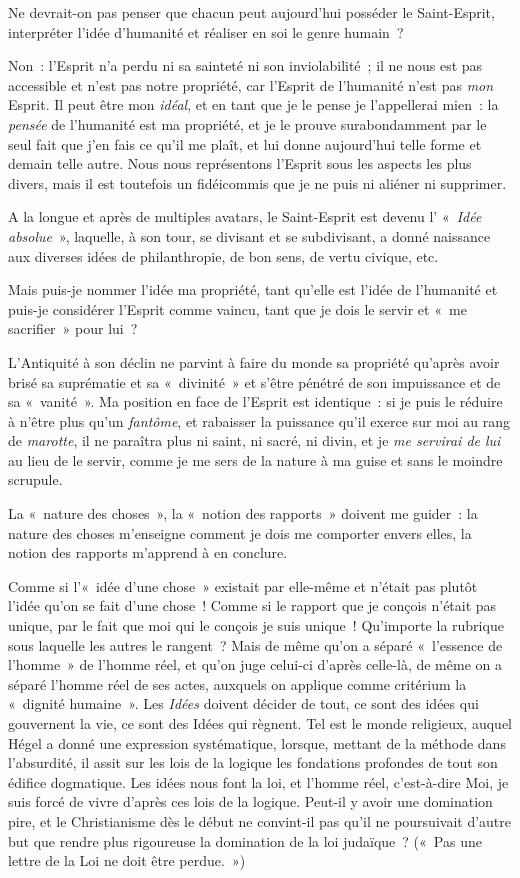 \documentclass[french,twoside]{book} %
\begin{document}
Ne devrait-on pas penser que chacun peut aujourd’hui posséder le Saint-Esprit, interpréter l’idée d’humanité et réaliser en soi le genre humain ?\par
Non : l’Esprit n’a perdu ni sa sainteté ni son inviolabilité ; il ne nous est pas accessible et n’est pas notre propriété, car l’Esprit de l’humanité n’est pas \emph{mon} Esprit. Il peut être mon \emph{idéal}, et en tant que je le pense je l’appellerai mien : la \emph{pensée} de l’humanité est ma propriété, et je le prouve surabondamment par le seul fait que j’en fais ce qu’il me plaît, et lui donne aujourd’hui telle forme et demain telle autre. Nous nous représentons l’Esprit sous les aspects les plus divers, mais il est toutefois un fidéicommis que je ne puis ni aliéner ni supprimer.\par
A la longue et après de multiples avatars, le Saint-Esprit est devenu l’ « \emph{Idée absolue} », laquelle, à son tour, se divisant et se subdivisant, a donné naissance aux  diverses idées de philanthropie, de bon sens, de vertu civique, etc.\par
Mais puis-je nommer l’idée ma propriété, tant qu’elle est l’idée de l’humanité et puis-je considérer l’Esprit comme vaincu, tant que je dois le servir et « me sacrifier » pour lui ?\par
L’Antiquité à son déclin ne parvint à faire du monde sa propriété qu’après avoir brisé sa suprématie et sa « divinité » et s’être pénétré de son impuissance et de sa « vanité ». Ma position en face de l’Esprit est identique : si je puis le réduire à n’être plus qu’un \emph{fantôme}, et rabaisser la puissance qu’il exerce sur moi au rang de \emph{marotte}, il ne paraîtra plus ni saint, ni sacré, ni divin, et je \emph{me servirai de lui} au lieu de le servir, comme je me sers de la nature à ma guise et sans le moindre scrupule.\par
La « nature des choses », la « notion des rapports » doivent me guider : la nature des choses m’enseigne comment je dois me comporter envers elles, la notion des rapports m’apprend à en conclure.\par
Comme si l’« idée d’une chose » existait par elle-même et n’était pas plutôt l’idée qu’on se fait d’une chose ! Comme si le rapport que je conçois n’était pas unique, par le fait que moi qui le conçois je suis unique ! Qu’importe la rubrique sous laquelle les autres le rangent ? Mais de même qu’on a séparé « l’essence de l’homme » de l’homme réel, et qu’on juge celui-ci d’après celle-là, de même on a séparé l’homme réel de ses actes, auxquels on applique comme critérium la « dignité humaine ». Les \emph{Idées} doivent décider de tout, ce sont des idées qui gouvernent la vie, ce sont des Idées qui règnent. Tel est le monde religieux, auquel Hégel a donné une expression systématique, lorsque, mettant de la méthode dans l’absurdité, il assit sur les lois de la logique les fondations profondes de tout son édifice dogmatique. Les idées nous font la loi, et l’homme réel, c’est-à-dire Moi, je suis forcé de vivre d’après ces lois de la logique. Peut-il y avoir  une domination pire, et le Christianisme dès le début ne convint-il pas qu’il ne poursuivait d’autre but que rendre plus rigoureuse la domination de la loi judaïque ? (« Pas une lettre de la Loi ne doit être perdue. »)\par
\end{document}
